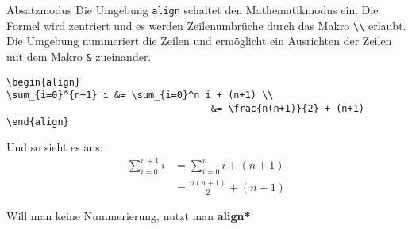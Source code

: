 \begin{frame}[fragile]{Absatzmodus}
Die Umgebung \texttt{align} schaltet den Mathematikmodus ein. Die Formel wird zentriert und es werden Zeilenumbrüche durch das Makro \texttt{\textbackslash\textbackslash} erlaubt. Die Umgebung nummeriert die Zeilen und ermöglicht ein Ausrichten der Zeilen mit dem Makro \texttt{\&} zueinander. 
\begin{lstlisting}[style=tex]
\begin{align}
\sum_{i=0}^{n+1} i &= \sum_{i=0}^n i + (n+1) \\
                                    &= \frac{n(n+1)}{2} + (n+1)
\end{align}
\end{lstlisting}

Und so sieht es aus:
\begin{align}
\sum_{i=0}^{n+1} i &= \sum_{i=0}^n i + (n+1) \\
                       &= \frac{n(n+1)}{2} + (n+1)
\end{align}%

Will man keine Nummerierung, nutzt man \textbf{align*}
\end{frame}

